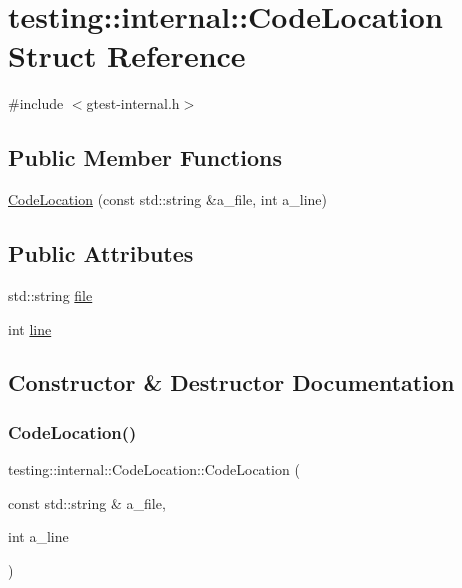 \hypertarget{structtesting_1_1internal_1_1CodeLocation}{}\section{testing\+::internal\+::Code\+Location Struct Reference}
\label{structtesting_1_1internal_1_1CodeLocation}


{\ttfamily \#include $<$gtest-\/internal.\+h$>$}

\subsection*{Public Member Functions}
\begin{DoxyCompactItemize}
\item 
\mbox{\hyperlink{structtesting_1_1internal_1_1CodeLocation_a323a11851c81629d632c47b9b767b8ac}{Code\+Location}} (const std\+::string \&a\+\_\+file, int a\+\_\+line)
\end{DoxyCompactItemize}
\subsection*{Public Attributes}
\begin{DoxyCompactItemize}
\item 
std\+::string \mbox{\hyperlink{structtesting_1_1internal_1_1CodeLocation_a38118056ad3c11359920274e393bc6b3}{file}}
\item 
int \mbox{\hyperlink{structtesting_1_1internal_1_1CodeLocation_a01c977c7e8834a05a6d6c40b0c416045}{line}}
\end{DoxyCompactItemize}


\subsection{Constructor \& Destructor Documentation}
\mbox{\label{structtesting_1_1internal_1_1CodeLocation_a323a11851c81629d632c47b9b767b8ac}} 
\subsubsection{\texorpdfstring{CodeLocation()}{CodeLocation()}}
{\footnotesize\ttfamily testing\+::internal\+::\+Code\+Location\+::\+Code\+Location (\begin{DoxyParamCaption}\item[{const std\+::string \&}]{a\+\_\+file,  }\item[{int}]{a\+\_\+line }\end{DoxyParamCaption})\hspace{0.3cm}{\ttfamily [inline]}}



